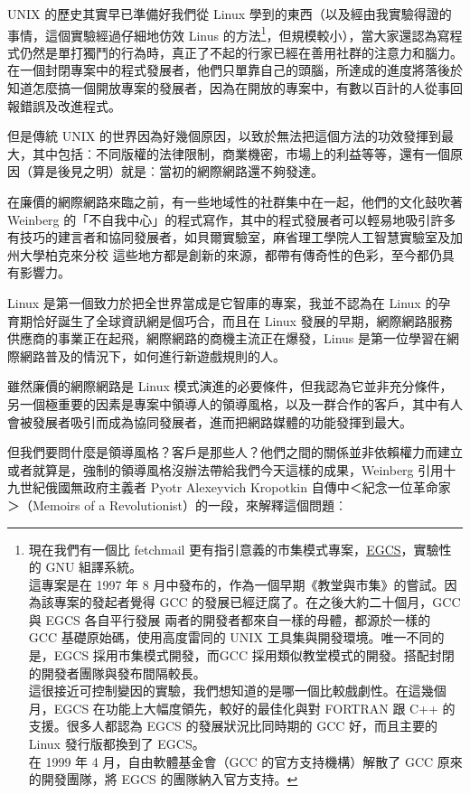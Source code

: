 \documentclass[10pt, b5paper]{book}
\makeatletter
\newcommand*{\shifttext}[2]{%
  \settowidth{\@tempdima}{#2}%
  \makebox[\@tempdima]{\hspace*{#1}#2}%
}
\makeatother
\begin{document}
UNIX 的歷史其實早已準備好我們從 Linux
學到的東西（以及經由我實驗得證的事情，這個實驗經過仔細地仿效 Linus
的方法\footnote{現在我們有一個比 fetchmail
  更有指引意義的市集模式專案，\href{http://egcs.cygnus.com/}{EGCS}，實驗性的
  GNU 組譯系統。\\這專案是在 1997 年 8
  月中發布的，作為一個早期《教堂與市集》的嘗試。因為該專案的發起者覺得
  GCC 的發展已經迂腐了。在之後大約二十個月，GCC 與 EGCS 各自平行發展
  \shifttext{1pt}{---}\shifttext{-1pt}{---} 兩者的開發者都來自一樣的母體，都源於一樣的 GCC
  基礎原始碼，使用高度雷同的 UNIX 工具集與開發環境。唯一不同的是，EGCS
  採用市集模式開發，而GCC
  採用類似教堂模式的開發。搭配封閉的開發者團隊與發布間隔較長。\\這很接近可控制變因的實驗，我們想知道的是哪一個比較戲劇性。在這幾個月，EGCS
  在功能上大幅度領先，較好的最佳化與對 FORTRAN 跟 C++
  的支援。很多人都認為 EGCS 的發展狀況比同時期的 GCC 好，而且主要的 Linux
  發行版都換到了 EGCS。\\在 1999 年 4 月，自由軟體基金會（GCC
  的官方支持機構）解散了 GCC 原來的開發團隊，將 EGCS 的團隊納入官方支持。}，但規模較小），當大家還認為寫程式仍然是單打獨鬥的行為時，真正了不起的行家已經在善用社群的注意力和腦力。在一個封閉專案中的程式發展者，他們只單靠自己的頭腦，所達成的進度將落後於知道怎麼搞一個開放專案的發展者，因為在開放的專案中，有數以百計的人從事回報錯誤及改進程式。

但是傳統 UNIX
的世界因為好幾個原因，以致於無法把這個方法的功效發揮到最大，其中包括︰不同版權的法律限制，商業機密，市場上的利益等等，還有一個原因（算是後見之明）就是︰當初的網際網路還不夠發達。

在廉價的網際網路來臨之前，有一些地域性的社群集中在一起，他們的文化鼓吹著
Weinberg
的「不自我中心」的程式寫作，其中的程式發展者可以輕易地吸引許多有技巧的建言者和協同發展者，如貝爾實驗室，麻省理工學院人工智慧實驗室及加州大學柏克來分校
\shifttext{1pt}{---}\shifttext{-1pt}{---} 這些地方都是創新的來源，都帶有傳奇性的色彩，至今都仍具有影響力。

Linux 是第一個致力於把全世界當成是它智庫的專案，我並不認為在 Linux
的孕育期恰好誕生了全球資訊網是個巧合，而且在 Linux
發展的早期，網際網路服務供應商的事業正在起飛，網際網路的商機主流正在爆發，Linus
是第一位學習在網際網路普及的情況下，如何進行新遊戲規則的人。

雖然廉價的網際網路是 Linux
模式演進的必要條件，但我認為它並非充分條件，另一個極重要的因素是專案中領導人的領導風格，以及一群合作的客戶，其中有人會被發展者吸引而成為協同發展者，進而把網路媒體的功能發揮到最大。

但我們要問什麼是領導風格？客戶是那些人？他們之間的關係並非依賴權力而建立
\shifttext{1pt}{---}\shifttext{-1pt}{---} 或者就算是，強制的領導風格沒辦法帶給我們今天這樣的成果，Weinberg
引用十九世紀俄國無政府主義者 Pyotr Alexeyvich Kropotkin
自傳中＜紀念一位革命家＞（Memoirs of a
Revolutionist）的一段，來解釋這個問題︰
\end{document}
